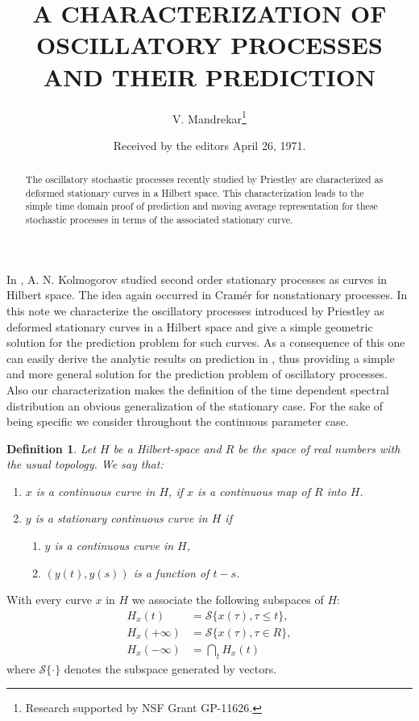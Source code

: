 \documentclass{article}
\title{A CHARACTERIZATION OF OSCILLATORY PROCESSES AND THEIR PREDICTION}
\author{V. Mandrekar\thanks{Research supported by NSF Grant GP-11626.}}
\date{Received by the editors April 26, 1971.}
\newtheorem{definition}{Definition}
\begin{document}
\maketitle

\begin{abstract}
The oscillatory stochastic processes recently studied by Priestley are characterized as deformed stationary curves in a Hilbert space. This characterization leads to the simple time domain proof of prediction and moving average representation for these stochastic processes in terms of the associated stationary curve.
\end{abstract}

In \cite{Kolmogorov}, A. N. Kolmogorov studied second order stationary processes as curves in Hilbert space. The idea again occurred in Cramér \cite{Cramer} for nonstationary processes. In this note we characterize the oscillatory processes introduced by Priestley \cite{Priestley} as deformed stationary curves in a Hilbert space and give a simple geometric solution for the prediction problem for such curves. As a consequence of this one can easily derive the analytic results on prediction in \cite{Abdrabbo}, thus providing a simple and more general solution for the prediction problem of oscillatory processes. Also our characterization makes the definition of the time dependent spectral distribution an obvious generalization of the stationary case. For the sake of being specific we consider throughout the continuous parameter case.

\begin{definition}\label{def:curves}
Let $H$ be a Hilbert-space and $R$ be the space of real numbers with the usual topology. We say that:
\begin{enumerate}[label=(\alph*)]
    \item $x$ is a continuous curve in $H$, if $x$ is a continuous map of $R$ into $H$.
    \item $y$ is a stationary continuous curve in $H$ if 
    \begin{enumerate}[label=(\roman*)]
        \item $y$ is a continuous curve in $H$,
        \item $(y(t), y(s))$ is a function of $t-s$.
    \end{enumerate}
\end{enumerate}
\end{definition}

With every curve $x$ in $H$ we associate the following subspaces of $H$:
\begin{align}
H_{x}(t) &=\mathcal{S}\{x(\tau), \tau \leq t\}, \label{eq:subspace1} \\
H_{x}(+\infty) &=\mathcal{S}\{x(\tau), \tau \in R\}, \label{eq:subspace2} \\
H_{x}(-\infty) &=\bigcap_{t} H_{x}(t) \label{eq:subspace3}
\end{align}
where $\mathcal{S}\{\cdot\}$ denotes the subspace generated by vectors.
\end{document}

